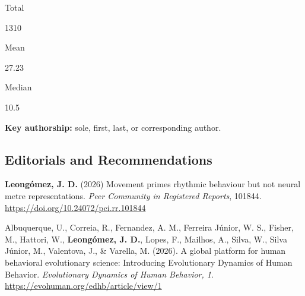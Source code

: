 \documentclass[11pt,a4paper,]{awesome-cv}
\begin{document}
\begin{tcolorbox}[enhanced,
  on line,
  boxsep=4pt, left=0pt,right=0pt,top=0pt,bottom=0pt,
  colframe=white,colback=teal,
  hyperurl={https://scholar.google.com/citations?user=8Q0jKHsAAAAJ}]
  \begin{minipage}[c]{0.325\linewidth}
    \begin{center}
      \begin{small} Total \end{small}
      \begin{LARGE} 1310 \end{LARGE}
    \end{center}
  \end{minipage}
  \begin{minipage}[c]{0.325\linewidth}
    \begin{center}
      \begin{small} Mean \end{small}
      \begin{LARGE} 27.23 \end{LARGE}
    \end{center}
  \end{minipage}
  \begin{minipage}[c]{0.325\linewidth}
    \begin{center}
      \begin{small} Median \end{small}
      \begin{LARGE} 10.5 \end{LARGE}
    \end{center}
  \end{minipage}
\end{tcolorbox}

\begin{importantnote}
  \textcolor{teal}{\faStar} \textbf{Key authorship:} sole, first, last, or corresponding author.
\end{importantnote}

\subsection{\texorpdfstring{\textbf{Editorials and Recommendations}}{}}\label{section}

\begingroup
  \footnotesize
  \setlength{\parindent}{-0.5in}
  \setlength{\leftskip}{0.5in}

\textcolor{teal}{\faStar} \textbf{Leongómez, J. D.} (2026) Movement
primes rhythmic behaviour but not neural metre representations.
\emph{Peer Community in Registered Reports}, 101844.
\url{https://doi.org/10.24072/pci.rr.101844}

Albuquerque, U., Correia, R., Fernandez, A. M., Ferreira Júnior, W. S.,
Fisher, M., Hattori, W., \textbf{Leongómez, J. D.}, Lopes, F., Mailhos,
A., Silva, W., Silva Júnior, M., Valentova, J., \& Varella, M. (2026). A
global platform for human behavioral evolutionary science: Introducing
Evolutionary Dynamics of Human Behavior. \emph{Evolutionary Dynamics of
Human Behavior, 1}. \url{https://evohuman.org/edhb/article/view/1}
\end{document}
